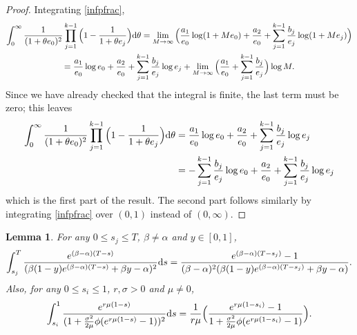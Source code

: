 \documentclass{article}
\theoremstyle{plain}
\newtheorem{lem}[thm]{Lemma}
\theoremstyle{definition}
\renewcommand{\d}{{\rm{d}}}
\begin{document}
\begin{proof}
Integrating \eqref{infpfrac},
\begin{multline*}
\int_0^\infty \frac{1}{(1+\theta e_0)^2} \prod_{j=1}^{k-1} \Big(1-\frac{1}{1+\theta e_j}\Big)\d \theta = \lim_{M\to\infty}\Big( \frac{a_1}{e_0}\log(1+ M e_0) + \frac{a_2}{e_0} + \sum_{j=1}^{k-1} \frac{b_j}{e_j}\log(1+M e_j)\Big)\\
= \frac{a_1}{e_0}\log e_0 + \frac{a_2}{e_0} + \sum_{j=1}^{k-1} \frac{b_j}{e_j}\log e_j + \lim_{M\to\infty}\Big(\frac{a_1}{e_0} + \sum_{j=1}^{k-1} \frac{b_j}{e_j}\Big)\log M.
\end{multline*}
Since we have already checked that the integral is finite, the last term must be zero; this leaves
\begin{align*}
\int_0^\infty \frac{1}{(1+\theta e_0)^2} \prod_{j=1}^{k-1} \Big(1-\frac{1}{1+\theta e_j}\Big)\d \theta &= \frac{a_1}{e_0}\log e_0 + \frac{a_2}{e_0} + \sum_{j=1}^{k-1} \frac{b_j}{e_j}\log e_j\\
&= -\sum_{j=1}^{k-1} \frac{b_j}{e_j}\log e_0 + \frac{a_2}{e_0} + \sum_{j=1}^{k-1} \frac{b_j}{e_j}\log e_j
\end{align*}
which is the first part of the result. The second part follows similarly by integrating \eqref{infpfrac} over $(0,1)$ instead of $(0,\infty)$.
\end{proof}


\begin{lem}\label{integrateout}
For any $0\le s_j \le T$, $\beta\neq \alpha$ and $y\in[0,1]$,
\[\int_{s_j}^{T} \frac{e^{(\beta-\alpha)(T-s)}}{(\beta(1-y)e^{(\beta-\alpha)(T-s)}+\beta y-\alpha)^2} \d s = \frac{e^{(\beta-\alpha)(T-s_j)}-1}{(\beta-\alpha)^2(\beta(1-y)e^{(\beta-\alpha)(T-s_j)}+ \beta y - \alpha)}.\]
Also, for any $0\le s_i \le 1$, $r,\sigma >0$ and $\mu\neq 0$,
\[\int_{s_i}^1 \frac{e^{r\mu (1-s)}}{(1+\frac{\sigma^2}{2\mu}\phi(e^{r\mu(1-s)}-1))^2} \d s = \frac{1}{r\mu}\Big(\frac{e^{r\mu(1-s_i)}-1}{1 + \frac{\sigma^2}{2\mu}\phi (e^{r\mu(1-s_i)}-1)}\Big).\]
\end{lem}
\end{document}
